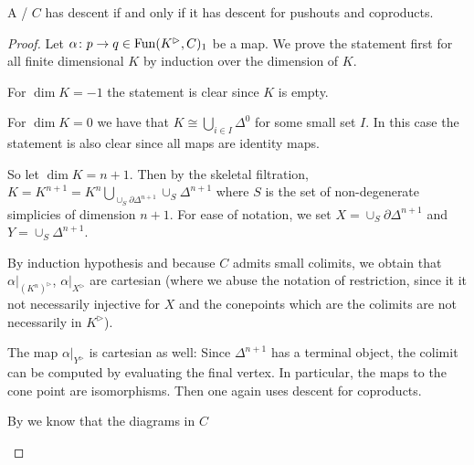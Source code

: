 \begin{lemma}
    A \inftycat/ $C$ has descent if and only if it has descent for pushouts and coproducts.
    \begin{proof}
        Let $\alpha\colon p\to q\in\operatorname{Fun}(K^{\rhd},C)_1$ be a map.
        We prove the statement first for all finite dimensional $K$ by induction over the dimension of $K$. %

        For $\dim K=-1$ the statement is clear since $K$ is empty.

        For $\dim K=0$ we have that $K\cong\bigcup\limits_{i\in I}\Delta^0$ for some small set $I$. 
        In this case the statement is also clear since all maps are identity maps.

        So let $\dim K=n+1$.
        Then by the skeletal filtration, $K=K^{n+1}=K^n\bigcup\limits_{\cup_S \partial\Delta^{n+1}}\cup_S \Delta^{n+1}$ where $S$ is the set of non-degenerate simplicies of dimension $n+1$.
        For ease of notation, we set $X=\cup_S \partial\Delta^{n+1}$ and $Y=\cup_S \Delta^{n+1}$.

        By induction hypothesis and because $C$ admits small colimits, we obtain that $\alpha|_{\left(K^n\right)^{\rhd}}$, $\alpha|_{X^{\rhd}}$ are cartesian (where we abuse the notation of restriction, since it it not necessarily injective for $X$ and the conepoints which are the colimits are not necessarily in $K^{\rhd}$).

        The map $\alpha|_{Y^{\rhd}}$ is cartesian as well: Since $\Delta^{n+1}$ has a terminal object, the colimit can be computed by evaluating the final vertex. 
        In particular, the maps to the cone point are isomorphisms.
        Then one again uses descent for coproducts.

        By %
        we know that the diagrams in $C$
        \begin{center}
\end{center}
\end{proof}
\end{lemma}
